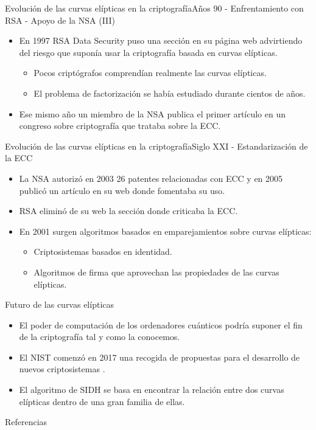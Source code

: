 \documentclass[spanish]{beamer}
\begin{document}
\begin{frame}[fragile]{Evolución de las curvas elípticas en la criptografía}{Años 90 - Enfrentamiento con RSA - Apoyo de la NSA (III)}
    \begin{itemize}
    \item En 1997 RSA Data Security puso una sección en su página web advirtiendo del riesgo que suponía usar la criptografía basada en curvas elípticas.
    \begin{itemize}
        \item Pocos criptógrafos comprendían realmente las curvas elípticas.
	    \item El problema de factorización se había estudiado durante cientos de años.
\end{itemize}
    \item Ese mismo año un miembro de la NSA publica
    el primer artículo en un congreso sobre criptografía que trataba sobre la ECC.
  \end{itemize}
\end{frame}

 \begin{frame}[fragile]{Evolución de las curvas elípticas en la criptografía}{Siglo XXI - Estandarización de la ECC}
    \begin{itemize}
    \item La NSA autorizó en 2003 26 patentes relacionadas
con ECC y en 2005 publicó un artículo en su web donde fomentaba su uso.
    \item RSA eliminó de su web la sección donde criticaba la ECC.
    \item En 2001 surgen algoritmos basados en emparejamientos sobre curvas elípticas: %
    \begin{itemize}
	    \item Criptosistemas basados en identidad.
	    \item Algoritmos de firma que aprovechan las propiedades de las curvas elípticas.    
    \end{itemize}
  \end{itemize}
\end{frame}

\begin{frame}[fragile]{Futuro de las curvas elípticas}
  \begin{itemize}
    \item El poder de computación de los ordenadores cuánticos podría suponer el fin de la criptografía tal y como la conocemos. %
    \item El NIST comenzó en 2017 una recogida de propuestas para el desarrollo de nuevos criptosistemas \parencite{computer_security_division_call_2017}. %
    \item El algoritmo de SIDH se basa en encontrar la relación entre dos curvas elípticas dentro de una gran familia de ellas.
    \end{itemize}
\end{frame}


\begin{frame}[t,allowframebreaks]{Referencias}
  \printbibliography[heading=none]
\end{frame}
\end{document}
